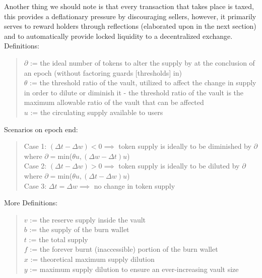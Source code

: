 \documentclass[letterpaper,11pt]{article}
\begin{document}
Another thing we should note is that every transaction that takes place is taxed, this provides a deflationary pressure by discouraging sellers, however, it primarily serves to reward holders through reflections (elaborated upon in the next section) and to automatically provide locked liquidity to a decentralized exchange.\\


\vspace{0.15cm}
\noindent Definitions:
\begin{quote}
$\partial$ := the ideal number of tokens to alter the supply by at the conclusion of an epoch (without factoring guards [thresholds] in)\\

$\theta$ := the threshold ratio of the vault, utilized to affect the change in supply in order to dilute or diminish it - the threshold ratio of the vault is the maximum allowable ratio of the vault that can be affected\\

$u$ := the circulating supply available to users\\

\end{quote}
Scenarios on epoch end:
\begin{quote}
Case 1: $(\Delta t - \Delta w) < 0 \implies$ token supply is ideally to be diminished by $\partial$ \\where $\partial =$min($\theta u,(\Delta w - \Delta t)u$)\\

Case 2: $(\Delta t - \Delta w) > 0 \implies$ token supply is ideally to be diluted by $\partial$ \\where $\partial =$min($\theta u,(\Delta t - \Delta w)u$)\\

Case 3: $\Delta t = \Delta w \implies$ no change in token supply\\
\end{quote}

\noindent More Definitions:
\begin{quote}
$v$ := the reserve supply inside the vault\\
$b$ := the supply of the burn wallet\\
$t$ := the total supply\\
$f$ := the forever burnt (inaccessible) portion of the burn wallet\\
$x$ := theoretical maximum supply dilution\\
$y$ := maximum supply dilution to ensure an ever-increasing vault size\\

\end{quote}
\end{document}
